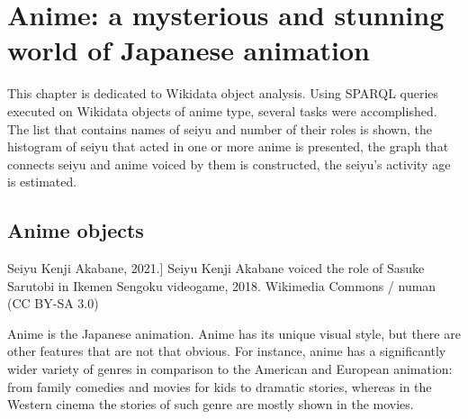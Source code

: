 
\chapter{Anime: a mysterious and stunning world of Japanese animation\protect\footnotemark}




This chapter is dedicated to  Wikidata object analysis. Using SPARQL queries executed on Wikidata objects of anime type, several tasks were accomplished. The list that contains names of seiyu and number of their roles is shown, the histogram of seiyu that acted in one or more anime is presented, the graph that connects seiyu and anime voiced by them is constructed, the seiyu's activity age is estimated.

\section{Anime objects}

\begin{marginfigure}[0.0cm]
{
	\setlength{\fboxsep}{0pt}%
	\setlength{\fboxrule}{1pt}%
}
\caption
[Seiyu Kenji Akabane, 2021.]
{
Seiyu Kenji Akabane voiced the role of Sasuke Sarutobi in Ikemen Sengoku videogame, 2018.\newline
Wikimedia Commons / numan (CC BY-SA 3.0)
}
\label{fig:seiyu}
\end{marginfigure}

Anime is the Japanese animation. Anime has its unique visual style, but there are other features that are not that obvious. For instance, anime has a significantly wider variety of genres in comparison to the American and European animation: from family comedies and movies for kids to dramatic stories, whereas in the Western cinema the stories of such genre are mostly shown in the movies.

